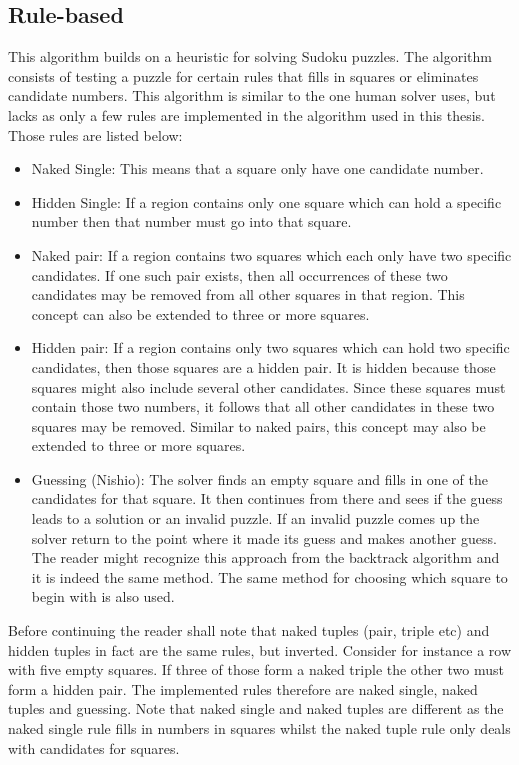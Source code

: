 \documentclass[a4paper,11pt]{kth-mag}
\begin{document}
\FloatBarrier
\subsection{Rule-based}
\label{sec:rulebasedBackground}
This algorithm builds on a heuristic for solving Sudoku puzzles.
The algorithm consists of testing a puzzle for certain rules that fills in squares or eliminates candidate numbers.
This algorithm is similar to the one human solver uses, but lacks as only a few rules are implemented in the algorithm used in this thesis. Those rules are listed below:

\begin{itemize}
    \item Naked Single: 
    This means that a square only have one candidate number.
    \item Hidden Single: 
    If a region contains only one square which can hold a specific number then that number must go into that square.
    \item Naked pair:
    If a region contains two squares which each only have two specific candidates.
If one such pair exists, then all occurrences of these two candidates may be removed from all other squares in that region.
This concept can also be extended to three or more squares.
    \item Hidden pair:
    If a region contains only two squares which can hold two specific candidates, then those squares are a hidden pair.
It is hidden because those squares might also include several other candidates.
Since these squares must contain those two numbers, it follows that all other candidates in these two squares may be removed.
Similar to naked pairs, this concept may also be extended to three or more squares.

    \item Guessing (Nishio):
    The solver finds an empty square and fills in one of the candidates for that square.
    It then continues from there and sees if the guess leads to a solution or an invalid puzzle.
    If an invalid puzzle comes up the solver return to the point where it made its guess and makes another guess.
    The reader might recognize this approach from the backtrack algorithm and it is indeed the same method.
    The same method for choosing which square to begin with is also used.
\end{itemize}

Before continuing the reader shall note that naked tuples (pair, triple etc) and hidden tuples in fact are the same rules, but inverted.
Consider for instance a row with five empty squares.
If three of those form a naked triple the other two must form a hidden pair.
The implemented rules therefore are naked single, naked tuples and guessing.
Note that naked single and naked tuples are different as the naked single rule fills in numbers in squares whilst the naked tuple rule only deals with candidates for squares.
\end{document}
